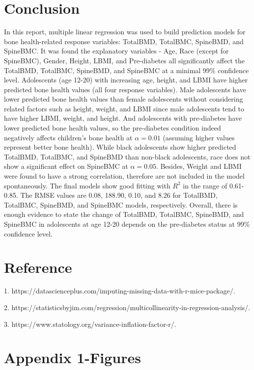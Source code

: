 \documentclass[11pt]{article}
\begin{document}
\section{Conclusion}
In this report, multiple linear regression was used to build prediction models for bone health-related response variables: TotalBMD, TotalBMC, SpineBMD, and SpineBMC. It was found the explanatory variables - Age, Race (except for SpineBMC), Gender, Height, LBMI, and  Pre-diabetes all significantly affect the TotalBMD, TotalBMC, SpineBMD, and SpineBMC at a minimal 99\% confidence level. Adolescents (age 12-20) with increasing age, height, and LBMI have higher predicted bone health values (all four response variables). Male adolescents have lower predicted bone health values than female adolescents without considering related factors such as height, weight, and LBMI since male adolescents tend to have higher LBMI, weight, and height. And adolescents with pre-diabetes have lower predicted bone health values, so the pre-diabetes condition indeed negatively affects children's bone health at $\alpha=0.01$ (assuming higher values represent better bone health). While black adolescents show higher predicted TotalBMD, TotalBMC, and SpineBMD than non-black adolescents, race does not show a significant effect on SpineBMC at $\alpha=0.05$. Besides, Weight and LBMI were found to have a strong correlation, therefore are not included in the model spontaneously. The final models show good fitting with $R^2$ in the range of 0.61-0.85. The RMSE values are 0.08, 188.90, 0.10, and 8.26 for TotalBMD, TotalBMC, SpineBMD, and SpineBMC models, respectively. Overall, there is enough evidence to state the change of TotalBMD, TotalBMC, SpineBMD, and SpineBMC in adolescents at age 12-20 depends on the pre-diabetes status at 99\% confidence level.

\newpage

\section*{Reference}
\smallskip

1. https://datascienceplus.com/imputing-missing-data-with-r-mice-package/.
\smallskip

2. https://statisticsbyjim.com/regression/multicollinearity-in-regression-analysis/.
\smallskip

3. https://www.statology.org/variance-inflation-factor-r/.
\smallskip

\section * {Appendix 1-Figures}	
        
\end{document}
